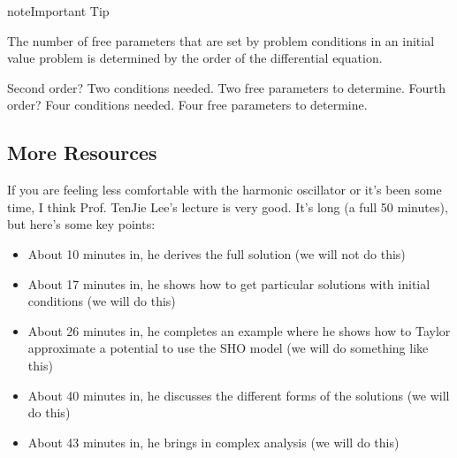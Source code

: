 \documentclass[letterpaper,10pt,english]{jupyterBook}
\begin{document}
\begin{sphinxadmonition}{note}{Important Tip}

\sphinxAtStartPar
The number of free parameters that are set by problem conditions in an initial value problem is determined by the order of the differential equation.

\sphinxAtStartPar
Second order? Two conditions needed. Two free parameters to determine. Fourth order? Four conditions needed. Four free parameters to determine.
\end{sphinxadmonition}


\subsection{More Resources}
\label{\detokenize{content/2_oscillations/readings-oscillators:more-resources}}
\sphinxAtStartPar
If you are feeling less comfortable with the harmonic oscillator or it’s been some time, I think Prof. Ten\sphinxhyphen{}Jie Lee’s lecture is very good. It’s long (a full 50 minutes), but here’s some key points:
\begin{itemize}
\item {} 
\sphinxAtStartPar
About 10 minutes in, he derives the full solution (we will not do this)

\item {} 
\sphinxAtStartPar
About 17 minutes in, he shows how to get particular solutions with initial conditions (we will do this)

\item {} 
\sphinxAtStartPar
About 26 minutes in, he completes an example where he shows how to Taylor approximate a potential to use the SHO model (we will do something like this)

\item {} 
\sphinxAtStartPar
About 40 minutes in, he discusses the different forms of the solutions (we will do this)

\item {} 
\sphinxAtStartPar
About 43 minutes in, he brings in complex analysis (we will do this)

\end{itemize}
\end{document}
